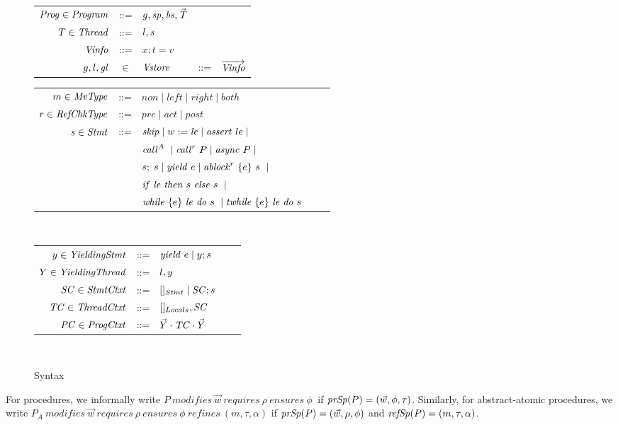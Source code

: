 \begin{figure}
\begin{tabular}{rclcl}
\end{tabular}
\begin{tabular}{rclcl}
$\Prog \in \Program$ & ::= & $\varsG, \specs, \bodies, \TS$ \\
$T \in \Thread$ & ::=  & $\varsL, \stmt$ \\
$\Vinfo$ & ::= & $x:t=v$ \\
$\varsG,\varsL,\vars$ & $\in$ & $\Vstore$ & ::= & $\Vinfos$ \\
\end{tabular}
\begin{tabular}{rclcl}
$m \in \moverType$ &::= &$\mathit{non} \mid \mathit{left} \mid \mathit{right} \mid \mathit{both}$ \\
$r \in \refType$ &::= &$\mathit{pre} \mid \mathit{act} \mid \mathit{post} $ \\
$\stmt \in \Stmt$ &::= & $\skipstmt \mid w := \locExpr \mid
\assert{le} \mid $ \\
                  & & $\call{A} \mid \call{r}{P} \mid \async{P} \mid $\\
                  & & $s;\;s \mid \yield{e} \mid \ablock{e}{s}{r} \mid$\\
                 & & $\ite{\locExpr}{s}{s} \mid$ \\
                  & & $\while{e}{\locExpr}{s} \mid \termwhile{e}{\locExpr}{s}$
                  \\ 
\end{tabular}\\
\begin{tabular}{rclcl}
$\YieldingStmt \in \mathit{YieldingStmt}$ &::= &$\yield{e} \mid \YieldingStmt;s$ \\
$\YieldingThread \in \mathit{YieldingThread}$ &::= &$\varsL, \YieldingStmt$ \\
$\StmtCtxt \in \mathit{StmtCtxt}$ &::= &$[]_{Stmt} \mid \StmtCtxt;s$ \\
$\ThreadCtxt \in \mathit{ThreadCtxt}$ &::= &$[]_{Locals}, \StmtCtxt$ \\
$\ProgCtxt \in \mathit{ProgCtxt}$ &::= &$\YieldingThreads \cdot \ThreadCtxt \cdot \YieldingThreads$ \\
\end{tabular}\\
\setlength{\tabcolsep}{6pt}
\caption{Syntax}
\label{fig:syntax}
\end{figure}

For procedures, we informally write $P\ \mathit{modifies}\
\vec{w}\ \mathit{requires}\ \rho\ \mathit{ensures}\ \phi\ $
if $\procSpecs(P) = (\vec{w}, \phi, \tau)$. Similarly, for
abstract-atomic procedures, we write $P_{A}\ \mathit{modifies}\
\vec{w}\ \mathit{requires}\ \rho\ \mathit{ensures}\ \phi\
\mathit{refines}\ (m, \tau, \alpha)$ if $\procSpecs(P) =
(\vec{w}, \rho, \phi)$ and $\procRefSpecs(P) = (m, \tau,
\alpha)$. 


